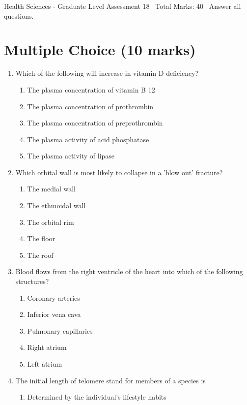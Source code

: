 \documentclass[12pt]{article}
\begin{document}
\begin{center}
Health Sciences - Graduate Level Assessment 18 \
Total Marks: 40 \
Answer all questions.
\end{center}

\section*{Multiple Choice (10 marks)}
\begin{enumerate}[label=\arabic*.]
\item Which of the following will increase in vitamin D deficiency?
\begin{enumerate}[label=(\alph*)]
    \item The plasma concentration of vitamin B 12
    \item The plasma concentration of prothrombin
    \item The plasma concentration of preprothrombin
    \item The plasma activity of acid phosphatase
    \item The plasma activity of lipase
\end{enumerate}
\item Which orbital wall is most likely to collapse in a 'blow out' fracture?
\begin{enumerate}[label=(\alph*)]
    \item The medial wall
    \item The ethmoidal wall
    \item The orbital rim
    \item The floor
    \item The roof
\end{enumerate}
\item Blood flows from the right ventricle of the heart into which of the following structures?
\begin{enumerate}[label=(\alph*)]
    \item Coronary arteries
    \item Inferior vena cava
    \item Pulmonary capillaries
    \item Right atrium
    \item Left atrium
\end{enumerate}
\item The initial length of telomere stand for members of a species is
\begin{enumerate}[label=(\alph*)]
    \item Determined by the individual's lifestyle habits

\end{enumerate}
\end{enumerate}
\end{document}
